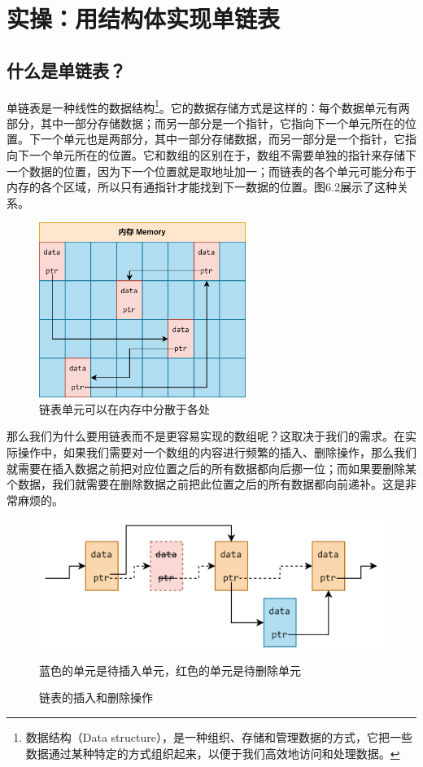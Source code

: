 \section{实操：用结构体实现单链表}
\subsection*{什么是单链表？}
单链表是一种线性的数据结构\footnote{数据结构（Data structure），是一种组织、存储和管理数据的方式，它把一些数据通过某种特定的方式组织起来，以便于我们高效地访问和处理数据。}。它的数据存储方式是这样的：每个数据单元有两部分，其中一部分存储数据；而另一部分是一个指针，它指向下一个单元所在的位置。下一个单元也是两部分，其中一部分存储数据，而另一部分是一个指针，它指向下一个单元所在的位置。它和数组的区别在于，数组不需要单独的指针来存储下一个数据的位置，因为下一个位置就是取地址加一；而链表的各个单元可能分布于内存的各个区域，所以只有通指针才能找到下一数据的位置。图6.2展示了这种关系。\par
\begin{figure}[htbp]
    \centering
    \includegraphics[width=0.6\textwidth]{../images/generalized_parts/06_list_in_the_memory.drawio.png}
    \caption{链表单元可以在内存中分散于各处}
\end{figure}
那么我们为什么要用链表而不是更容易实现的数组呢？这取决于我们的需求。在实际操作中，如果我们需要对一个数组的内容进行频繁的插入、删除操作，那么我们就需要在插入数据之前把对应位置之后的所有数据都向后挪一位；而如果要删除某个数据，我们就需要在删除数据之前把此位置之后的所有数据都向前递补。这是非常麻烦的。\par
\begin{figure}[htbp]
    \centering
    \includegraphics[width=\textwidth]{../images/generalized_parts/06_operation_on_list.drawio.png}
    \caption{链表的插入和删除操作}
    \footnotesize{蓝色的单元是待插入单元，红色的单元是待删除单元}
\end{figure}
